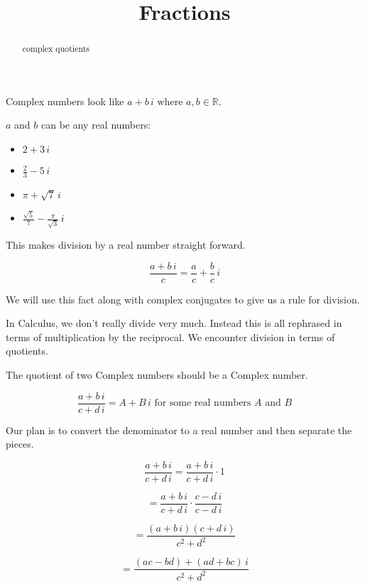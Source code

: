 \documentclass{ximera}
\title{Fractions}
\begin{document}
\begin{abstract}
complex quotients
\end{abstract}
\maketitle




Complex numbers look like $a + b \, i$ where $a, b \in \mathbb{R}$.


$a$ and $b$ can be any real numbers:



\begin{itemize}
	\item $2 + 3 \, i$
	\item $\frac{2}{3} - 5 \, i$
	\item $\pi + \sqrt{7} \, i$
	\item $\frac{\sqrt{5}}{7} - \frac{\pi}{\sqrt{3}} \, i$
\end{itemize}



This makes division by a real number straight forward.




\[
\frac{a + b \, i}{c} = \frac{a}{c} + \frac{b}{c} \, i
\]





We will use this fact along with complex conjugates to give us a rule for division.



In Calculus, we don't really divide very much.  Instead this is all rephrased in terms of multiplication by the reciprocal.  We encounter division in terms of quotients.


The quotient of two Complex numbers should be a Complex number.

\[
\frac{a + b \, i}{c + d \, i}  = A + B \, i  \text{ for some real numbers } A \text{ and } B
\]


Our plan is to convert the denominator to a real number and then separate the pieces.



\[
\frac{a + b \, i}{c + d \, i} = \frac{a + b \, i}{c + d \, i}  \cdot 1 
\]

\[
= \frac{a + b \, i}{c + d \, i} \cdot \frac{c - d \, i}{c - d \, i} 
\]

\[
= \frac{(a + b \, i)(c + d \, i)}{c^2 + d^2} 
\]

\[
= \frac{(ac - bd) + (ad + bc) \, i}{c^2 + d^2} 
\]
\end{document}
